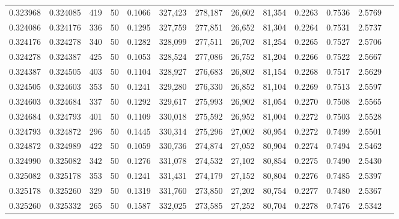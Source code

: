 \begin{tabular}{rrrrrrrrrrrrr}
0.323968 & 0.324085 &   419 &  50 &                                     0.1066 & 327,423 & 278,187 &  26,602 &  81,354 & 0.2263 & 0.7536 & 2.5769 \\
0.324086 & 0.324176 &   336 &  50 &                                     0.1295 & 327,759 & 277,851 &  26,652 &  81,304 & 0.2264 & 0.7531 & 2.5737 \\
0.324176 & 0.324278 &   340 &  50 &                                     0.1282 & 328,099 & 277,511 &  26,702 &  81,254 & 0.2265 & 0.7527 & 2.5706 \\
0.324278 & 0.324387 &   425 &  50 &                                     0.1053 & 328,524 & 277,086 &  26,752 &  81,204 & 0.2266 & 0.7522 & 2.5667 \\
0.324387 & 0.324505 &   403 &  50 &                                     0.1104 & 328,927 & 276,683 &  26,802 &  81,154 & 0.2268 & 0.7517 & 2.5629 \\
0.324505 & 0.324603 &   353 &  50 &                                     0.1241 & 329,280 & 276,330 &  26,852 &  81,104 & 0.2269 & 0.7513 & 2.5597 \\
0.324603 & 0.324684 &   337 &  50 &                                     0.1292 & 329,617 & 275,993 &  26,902 &  81,054 & 0.2270 & 0.7508 & 2.5565 \\
0.324684 & 0.324793 &   401 &  50 &                                     0.1109 & 330,018 & 275,592 &  26,952 &  81,004 & 0.2272 & 0.7503 & 2.5528 \\
0.324793 & 0.324872 &   296 &  50 &                                     0.1445 & 330,314 & 275,296 &  27,002 &  80,954 & 0.2272 & 0.7499 & 2.5501 \\
0.324872 & 0.324989 &   422 &  50 &                                     0.1059 & 330,736 & 274,874 &  27,052 &  80,904 & 0.2274 & 0.7494 & 2.5462 \\
0.324990 & 0.325082 &   342 &  50 &                                     0.1276 & 331,078 & 274,532 &  27,102 &  80,854 & 0.2275 & 0.7490 & 2.5430 \\
0.325082 & 0.325178 &   353 &  50 &                                     0.1241 & 331,431 & 274,179 &  27,152 &  80,804 & 0.2276 & 0.7485 & 2.5397 \\
0.325178 & 0.325260 &   329 &  50 &                                     0.1319 & 331,760 & 273,850 &  27,202 &  80,754 & 0.2277 & 0.7480 & 2.5367 \\
0.325260 & 0.325332 &   265 &  50 &                                     0.1587 & 332,025 & 273,585 &  27,252 &  80,704 & 0.2278 & 0.7476 & 2.5342 \\

\end{tabular}
